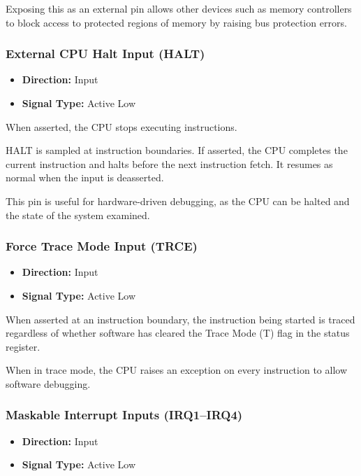 Exposing this as an external pin allows other devices such as memory controllers to block access to protected regions
of memory by raising bus protection errors.

\subsubsection{External CPU Halt Input (HALT)}

\begin{itemize}
	\item \textbf{Direction:} Input
	\item \textbf{Signal Type:} Active Low
\end{itemize}

When asserted, the CPU stops executing instructions.

HALT is sampled at instruction boundaries. If asserted, the CPU completes the current instruction and halts before the
next instruction fetch. It resumes as normal when the input is deasserted.

This pin is useful for hardware-driven debugging, as the CPU can be halted and the state of the system examined.

\subsubsection{Force Trace Mode Input (TRCE)}

\begin{itemize}
	\item \textbf{Direction:} Input
	\item \textbf{Signal Type:} Active Low
\end{itemize}

When asserted at an instruction boundary, the instruction being started is traced regardless of whether software has
cleared the Trace Mode (T) flag in the status register.

When in trace mode, the CPU raises an exception on every instruction to allow software debugging.

\subsubsection{Maskable Interrupt Inputs (IRQ1--IRQ4)}

\begin{itemize}
	\item \textbf{Direction:} Input
	\item \textbf{Signal Type:} Active Low
\end{itemize}

